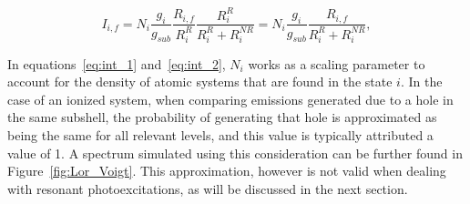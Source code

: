  \begin{equation}
    I_{i,f}=N_i \frac{g_i}{g_{sub}} \frac{R_{i,f}}{R_i^R} \frac{R_i^R}{R_i^R + R_i^{NR}}=N_i \frac{g_i}{g_{sub}} \frac{R_{i,f}}{R_i^R+R_i^{NR}}, \label{eq:int_2}
 \end{equation}

 In equations~\eqref{eq:int_1} and~\eqref{eq:int_2}, $N_i$ works as a scaling parameter to account for the density of atomic systems that are found in the state $i$. In the case of an ionized system, when comparing emissions generated due to a hole in the same subshell, the probability of generating that hole is approximated as being the same for all relevant levels, and this value is typically attributed a value of 1. A spectrum simulated using this consideration can be further found in Figure~\ref{fig:Lor_Voigt}. This approximation, however is not valid when dealing with resonant photoexcitations, as will be discussed in the next section.
 